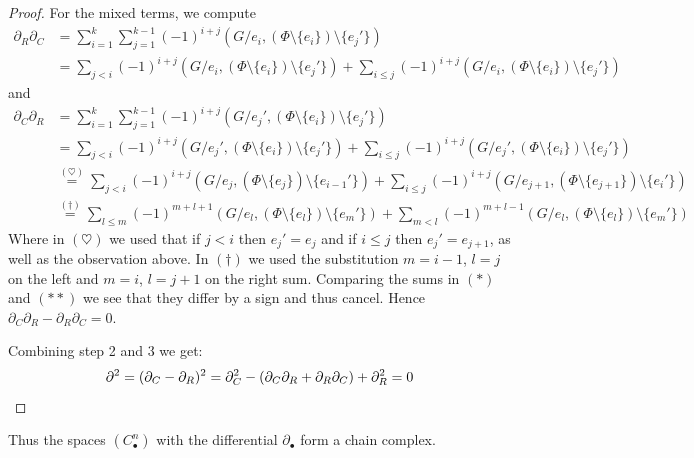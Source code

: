 \begin{proof}
	For the mixed terms, we compute
	\begin{align*}
		\partial_{R} \partial_{C} &=  \sum_{i=1}^{k} \sum_{j=1}^{k-1} (-1)^{i+j}(G / e_{i}, (\Phi \setminus \{e_{i}\} ) \setminus \{e_{j}'\})  \\
					   &= \sum_{j < i} (-1)^{i+j} (G / e_{i}, (\Phi \setminus \{e_{i}\} ) \setminus \{e_{j}'\}) + \sum_{i \leq j} (-1)^{i+j}
					   (G / e_{i}, (\Phi \setminus \{e_{i}\} ) \setminus \{e_{j}'\}) \tag{$*$}
	\end{align*}
	and
	\begin{align*}
		\partial_{C} \partial_{R} &=  \sum_{i=1}^{k} \sum_{j=1}^{k-1} (-1)^{i+j}(G / e_{j}', (\Phi \setminus \{e_{i}\} ) \setminus \{e_{j}'\})  \\
					   &= \sum_{j < i} (-1)^{i+j} (G / e_{j}', (\Phi \setminus \{e_{i}\} ) \setminus \{e_{j}'\}) + \sum_{i \leq j} (-1)^{i+j}
					   (G / e_{j}', (\Phi \setminus \{e_{i}\} ) \setminus \{e_{j}'\}) \\
					   &\stackrel{(\heartsuit)}{=} \sum_{j < i} (-1)^{i+j} (G / e_{j}, (\Phi \setminus \{e_{j}\} ) \setminus \{e_{i-1}'\}) + \sum_{i \leq j} (-1)^{i+j}
					   (G / e_{j+1}, (\Phi \setminus \{e_{j+1}\} ) \setminus \{e_{i}'\}) \\
					   &\stackrel{(\dagger)}{=} \sum_{l \leq m} (-1)^{m+l+1} (G / e_{l}, (\Phi \setminus \{e_{l}\} ) \setminus \{e_{m}'\}) + \sum_{m < l} (-1)^{m+l-1}
					   (G / e_{l}, (\Phi \setminus \{e_{l}\} ) \setminus \{e_{m}'\}) \tag{$* *$}
	\end{align*}
	Where in $(\heartsuit)$ we used that if $j < i$ then $e_{j}' = e_{j}$ and if $i \leq j$ then $e_{j}' = e_{j+1}$, as well as the observation above.
	In $(\dagger)$ we used the substitution  $m = i-1$,  $l = j$ on the left and  $m = i$,  $l = j+1$ on the right sum.
	Comparing the sums in $(*)$ and $(* *)$ we see that they differ by a sign and thus cancel. Hence  $\partial_{C} \partial_{R} - \partial_{R} \partial_{C} = 0$.

	Combining step 2 and 3 we get:
	\[
		\partial^2 = (\partial_{C} - \partial_{R})^2 = \partial_{C}^2 - (\partial_{C} \partial_{R} + \partial_{R} \partial_{C}) + \partial_{R}^2 = 0\qedhere
	\]
\end{proof}

Thus the spaces $(C^{n}_{\bullet})$ with the differential $\partial_{\bullet}$ form a chain complex.

